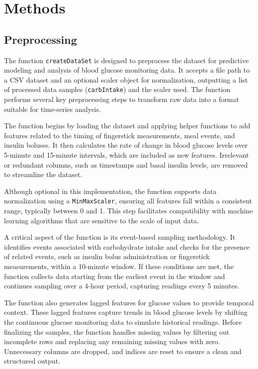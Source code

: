 
\section{Methods}

\subsection{Preprocessing}
The function \texttt{createDataSet} is designed to preprocess the dataset for predictive modeling and analysis of blood glucose monitoring data. It accepts a file path to a CSV dataset and an optional scaler object for normalization, outputting a list of processed data samples (\texttt{carbIntake}) and the scaler used. The function performs several key preprocessing steps to transform raw data into a format suitable for time-series analysis.

The function begins by loading the dataset and applying helper functions to add features related to the timing of fingerstick measurements, meal events, and insulin boluses. It then calculates the rate of change in blood glucose levels over 5-minute and 15-minute intervals, which are included as new features. Irrelevant or redundant columns, such as timestamps and basal insulin levels, are removed to streamline the dataset.

Although optional in this implementation, the function supports data normalization using a \texttt{MinMaxScaler}, ensuring all features fall within a consistent range, typically between 0 and 1. This step facilitates compatibility with machine learning algorithms that are sensitive to the scale of input data.

A critical aspect of the function is its event-based sampling methodology. It identifies events associated with carbohydrate intake and checks for the presence of related events, such as insulin bolus administration or fingerstick measurements, within a 10-minute window. If these conditions are met, the function collects data starting from the earliest event in the window and continues sampling over a 4-hour period, capturing readings every 5 minutes.

The function also generates lagged features for glucose values to provide temporal context. These lagged features capture trends in blood glucose levels by shifting the continuous glucose monitoring data to simulate historical readings. Before finalizing the samples, the function handles missing values by filtering out incomplete rows and replacing any remaining missing values with zero. Unnecessary columns are dropped, and indices are reset to ensure a clean and structured output.


